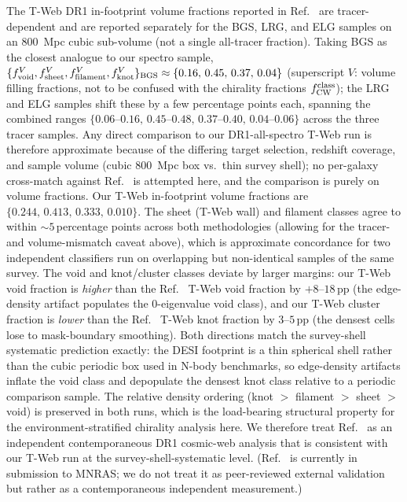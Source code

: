 \documentclass[twocolumn,linenumbers]{aastex702}
\begin{document}
The T-Web DR1 in-footprint volume fractions reported in
Ref.~\cite{TWebDESI2026} are tracer-dependent and are reported
separately for the BGS, LRG, and ELG samples on an $800$~Mpc cubic
sub-volume (not a single all-tracer fraction). Taking BGS as the
closest analogue to our spectro sample,
$\{f^{V}_{\rm void}, f^{V}_{\rm sheet}, f^{V}_{\rm filament}, f^{V}_{\rm knot}\}_{\rm BGS}
\approx \{0.16,\, 0.45,\, 0.37,\, 0.04\}$ (superscript $V$: volume
filling fractions, not to be confused with the chirality fractions
$f_{\rm CW}^{\rm class}$);
the LRG and ELG samples shift these by a few percentage points each,
spanning the combined ranges
$\{0.06\text{--}0.16,\, 0.45\text{--}0.48,\, 0.37\text{--}0.40,\,
0.04\text{--}0.06\}$
across the three tracer samples. Any direct
comparison to our DR1-all-spectro T-Web run is therefore approximate
because of the differing target selection, redshift coverage, and
sample volume (cubic $800$~Mpc box vs.\ thin survey shell); no
per-galaxy cross-match against Ref.~\cite{TWebDESI2026} is attempted
here, and the comparison is purely on volume fractions. Our T-Web
in-footprint volume fractions
are $\{0.244,\, 0.413,\, 0.333,\, 0.010\}$. The sheet (T-Web wall) and
filament classes agree to within ${\sim}5$\,percentage points across
both methodologies (allowing for the tracer- and volume-mismatch
caveat above), which is approximate concordance for two independent
classifiers run on overlapping but non-identical samples of the same
survey. The void and knot/cluster classes
deviate by larger margins: our T-Web void fraction is \emph{higher} than
the Ref.~\cite{TWebDESI2026} T-Web void fraction by $+8$--$18$\,pp (the edge-density artifact populates the
0-eigenvalue void class), and our T-Web cluster fraction is
\emph{lower} than the Ref.~\cite{TWebDESI2026} T-Web knot fraction by $3$--$5$\,pp (the densest
cells lose to mask-boundary smoothing). Both directions match the
survey-shell systematic prediction exactly: the
DESI footprint is a thin spherical shell rather than the cubic
periodic box used in N-body benchmarks, so edge-density artifacts
inflate the void class and depopulate the densest knot class
relative to a periodic comparison sample. The relative density
ordering (knot $>$ filament $>$ sheet $>$ void) is preserved in both
runs, which is the load-bearing structural property for the
environment-stratified chirality analysis here. We therefore treat
Ref.~\cite{TWebDESI2026} as an independent contemporaneous DR1
cosmic-web analysis that is consistent with our T-Web run at the
survey-shell-systematic level. (Ref.~\cite{TWebDESI2026} is currently
in submission to MNRAS; we do not treat it as peer-reviewed external
validation but rather as a contemporaneous independent measurement.)
\end{document}
